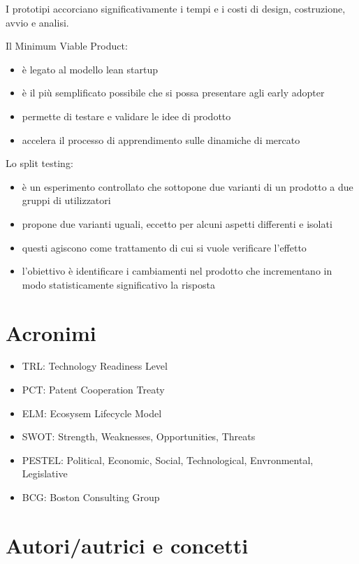 \documentclass[answers, a4paper, 11pt]{exam}
\begin{document}
I prototipi accorciano significativamente i tempi e i costi di design, costruzione, avvio e analisi.

Il Minimum Viable Product:

\begin{itemize}
    \item è legato al modello lean startup
    \item è il più semplificato possibile che si possa presentare agli early adopter
    \item permette di testare e validare le idee di prodotto
    \item accelera il processo di apprendimento sulle dinamiche di mercato
\end{itemize}

Lo split testing:

\begin{itemize}
    \item è un esperimento controllato che sottopone due varianti di un prodotto a due gruppi di utilizzatori
    \item propone due varianti uguali, eccetto per alcuni aspetti differenti e isolati
    \item questi agiscono come trattamento di cui si vuole verificare l'effetto
    \item l'obiettivo è identificare i cambiamenti nel prodotto che incrementano in modo statisticamente significativo la risposta 
\end{itemize}

\section{Acronimi}
\begin{itemize}
    \item TRL: Technology Readiness Level
    \item PCT: Patent Cooperation Treaty
    \item ELM: Ecosysem Lifecycle Model
    \item SWOT: Strength, Weaknesses, Opportunities, Threats
    \item PESTEL: Political, Economic, Social, Technological, Envronmental, Legislative
    \item BCG: Boston Consulting Group
\end{itemize}

\section{Autori/autrici e concetti}
\end{document}
